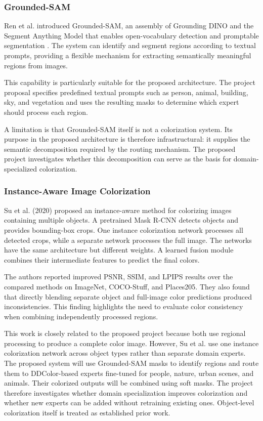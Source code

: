\documentclass{FastFyp}
\begin{document}
\subsubsection{Grounded-SAM}

Ren et al. introduced Grounded-SAM, an assembly of Grounding DINO and the Segment Anything Model that enables open-vocabulary detection and promptable segmentation \cite{ref17}. The system can identify and segment regions according to textual prompts, providing a flexible mechanism for extracting semantically meaningful regions from images.

This capability is particularly suitable for the proposed architecture. The project proposal specifies predefined textual prompts such as person, animal, building, sky, and vegetation and uses the resulting masks to determine which expert should process each region.

A limitation is that Grounded-SAM itself is not a colorization system. Its purpose in the proposed architecture is therefore infrastructural: it supplies the semantic decomposition required by the routing mechanism. The proposed project investigates whether this decomposition can serve as the basis for domain-specialized colorization.

\subsubsection{Instance-Aware Image Colorization}

Su et al. (2020) proposed an instance-aware method for colorizing images containing multiple objects\cite{su2020instance}. A pretrained Mask R-CNN detects objects and provides bounding-box crops. One instance colorization network processes all detected crops, while a separate network processes the full image. The networks have the same architecture but different weights. A learned fusion module combines their intermediate features to predict the final colors.

The authors reported improved PSNR, SSIM, and LPIPS results over the compared methods on ImageNet, COCO-Stuff, and Places205. They also found that directly blending separate object and full-image color predictions produced inconsistencies. This finding highlights the need to evaluate color consistency when combining independently processed regions.

This work is closely related to the proposed project because both use regional processing to produce a complete color image. However, Su et al. use one instance colorization network across object types rather than separate domain experts. The proposed system will use Grounded-SAM masks to identify regions and route them to DDColor-based experts fine-tuned for people, nature, urban scenes, and animals. Their colorized outputs will be combined using soft masks. The project therefore investigates whether domain specialization improves colorization and whether new experts can be added without retraining existing ones. Object-level colorization itself is treated as established prior work.
\end{document}
